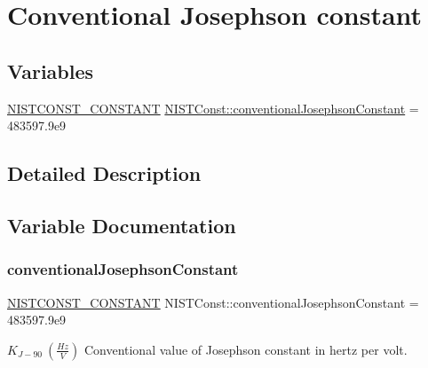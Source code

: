 \hypertarget{group___n_i_s_t_const-_conventional_josephson_constant}{}\section{Conventional Josephson constant}
\label{group___n_i_s_t_const-_conventional_josephson_constant}
\subsection*{Variables}
\begin{DoxyCompactItemize}
\item 
\mbox{\hyperlink{group___n_i_s_t_const-_macros_ga2b0fc1d7452373f816175dd86ce26729}{N\+I\+S\+T\+C\+O\+N\+S\+T\+\_\+\+C\+O\+N\+S\+T\+A\+NT}} \mbox{\hyperlink{group___n_i_s_t_const-_conventional_josephson_constant_gaf7118c5d748d244860cd847487b8aa96}{N\+I\+S\+T\+Const\+::conventional\+Josephson\+Constant}} = 483597.\+9e9
\end{DoxyCompactItemize}


\subsection{Detailed Description}


\subsection{Variable Documentation}
\mbox{\label{group___n_i_s_t_const-_conventional_josephson_constant_gaf7118c5d748d244860cd847487b8aa96}} 
\subsubsection{\texorpdfstring{conventional\+Josephson\+Constant}{conventionalJosephsonConstant}}
{\footnotesize\ttfamily \mbox{\hyperlink{group___n_i_s_t_const-_macros_ga2b0fc1d7452373f816175dd86ce26729}{N\+I\+S\+T\+C\+O\+N\+S\+T\+\_\+\+C\+O\+N\+S\+T\+A\+NT}} N\+I\+S\+T\+Const\+::conventional\+Josephson\+Constant = 483597.\+9e9}

$K_{J-90} \ (\frac{Hz}{V})$ Conventional value of Josephson constant in hertz per volt. 